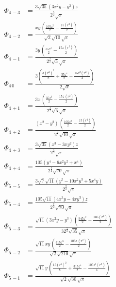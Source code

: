 \documentclass[10pt]{article}
\begin{document}
\begin{align*}
    \Phi_{4\, -3} &= \frac{3 \sqrt{35} \left( 3 {{x}^{2}} y-{{y}^{3}}\right)  z}{{{2}^{\frac{5}{2}}} \sqrt{\ensuremath{\pi} }} \\
    \Phi_{4\, -2} &= \frac{x y\, \left( \frac{105 {{z}^{2}}}{2}-\frac{15 \left( r^2\right) }{2}\right) }{\sqrt{2} \sqrt{10} \sqrt{\ensuremath{\pi} }} \\
    \Phi_{4\, -1} &= \frac{3 y\, \left( \frac{35 {{z}^{3}}}{2}-\frac{15 z\, \left( r^2\right) }{2}\right) }{{{2}^{\frac{3}{2}}} \sqrt{5} \sqrt{\ensuremath{\pi} }} \\
    \Phi_{4\, 0} &= \frac{3 \left( \frac{3 {{\left( r^2\right) }^{2}}}{8}+\frac{35 {{z}^{4}}}{8}-\frac{15 {{z}^{2}} \left( r^2\right) }{4}\right) }{2 \sqrt{\ensuremath{\pi} }} \\
    \Phi_{4\, +1} &= \frac{3 x\, \left( \frac{35 {{z}^{3}}}{2}-\frac{15 z\, \left( r^2\right) }{2}\right) }{{{2}^{\frac{3}{2}}} \sqrt{5} \sqrt{\ensuremath{\pi} }} \\
    \Phi_{4\, +2} &= \frac{\left( {{x}^{2}}-{{y}^{2}}\right) \, \left( \frac{105 {{z}^{2}}}{2}-\frac{15 \left( r^2\right) }{2}\right) }{{{2}^{\frac{3}{2}}} \sqrt{10} \sqrt{\ensuremath{\pi} }} \\
    \Phi_{4\, +3} &= \frac{3 \sqrt{35} \left( {{x}^{3}}-3 x {{y}^{2}}\right)  z}{{{2}^{\frac{5}{2}}} \sqrt{\ensuremath{\pi} }} \\
    \Phi_{4\, +4} &= \frac{105 \left( {{y}^{4}}-6 {{x}^{2}} {{y}^{2}}+{{x}^{4}}\right) }{{{2}^{\frac{7}{2}}} \sqrt{70} \sqrt{\ensuremath{\pi} }} \\
%
    \Phi_{5\, -5} &= \frac{3 \sqrt{7} \sqrt{11} \left( {{y}^{5}}-10 {{x}^{2}} {{y}^{3}}+5 {{x}^{4}} y\right) }{{{2}^{\frac{9}{2}}} \sqrt{\ensuremath{\pi} }} \\
    \Phi_{5\, -4} &= \frac{105 \sqrt{11} \left( 4 {{x}^{3}} y-4 x {{y}^{3}}\right)  z}{{{2}^{\frac{7}{2}}} \sqrt{70} \sqrt{\ensuremath{\pi} }} \\
    \Phi_{5\, -3} &= \frac{\sqrt{11} \left( 3 {{x}^{2}} y-{{y}^{3}}\right) \, \left( \frac{945 {{z}^{2}}}{2}-\frac{105 \left( r^2\right) }{2}\right) }{3 {{2}^{\frac{7}{2}}} \sqrt{35} \sqrt{\ensuremath{\pi} }} \\
    \Phi_{5\, -2} &= \frac{\sqrt{11} x y\, \left( \frac{315 {{z}^{3}}}{2}-\frac{105 z\, \left( r^2\right) }{2}\right) }{\sqrt{2} \sqrt{210} \sqrt{\ensuremath{\pi} }} \\
    \Phi_{5\, -1} &= \frac{\sqrt{11} y\, \left( \frac{15 {{\left( r^2\right) }^{2}}}{8}+\frac{315 {{z}^{4}}}{8}-\frac{105 {{z}^{2}} \left( r^2\right) }{4}\right) }{\sqrt{2} \sqrt{30} \sqrt{\ensuremath{\pi} }} \\

\end{align*}
\end{document}
